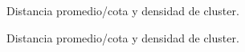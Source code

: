 \documentclass[12pt]{article}
\begin{document}
\begin{figure}[h!]
	\centering
	\caption{Distancia promedio/cota y densidad de cluster.}\label{Figura 2:}
\end{figure}
\begin{figure}[h!]
	\centering
	\caption{Distancia promedio/cota y densidad de cluster.}\label{Figura 2:}
\end{figure}
\end{document}
